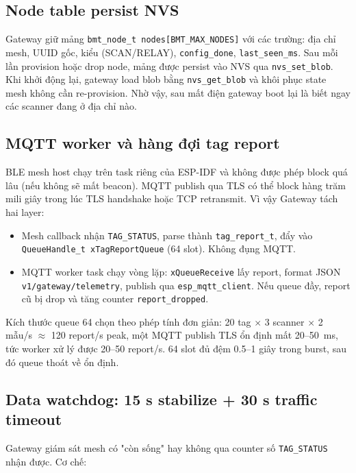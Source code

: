 \subsection{Node table persist NVS}

Gateway giữ mảng \texttt{bmt\_node\_t nodes[BMT\_MAX\_NODES]} với các trường: địa chỉ mesh, UUID gốc, kiểu (SCAN/RELAY), \texttt{config\_done}, \texttt{last\_seen\_ms}. Sau mỗi lần provision hoặc drop node, mảng được persist vào NVS qua \texttt{nvs\_set\_blob}. Khi khởi động lại, gateway load blob bằng \texttt{nvs\_get\_blob} và khôi phục state mesh không cần re-provision. Nhờ vậy, sau mất điện gateway boot lại là biết ngay các scanner đang ở địa chỉ nào.

\subsection{MQTT worker và hàng đợi tag report}

BLE mesh host chạy trên task riêng của ESP-IDF và không được phép block quá lâu (nếu không sẽ mất beacon). MQTT publish qua TLS có thể block hàng trăm mili giây trong lúc TLS handshake hoặc TCP retransmit. Vì vậy Gateway tách hai layer:

\begin{itemize}
    \item Mesh callback nhận \texttt{TAG\_STATUS}, parse thành \texttt{tag\_report\_t}, đẩy vào \texttt{QueueHandle\_t xTagReportQueue} (64 slot). Không đụng MQTT.
    \item MQTT worker task chạy vòng lặp: \texttt{xQueueReceive} lấy report, format JSON \texttt{v1/gateway/telemetry}, publish qua \texttt{esp\_mqtt\_client}. Nếu queue đầy, report cũ bị drop và tăng counter \texttt{report\_dropped}.
\end{itemize}

Kích thước queue 64 chọn theo phép tính đơn giản: 20 tag $\times$ 3 scanner $\times$ 2 mẫu/s $\approx$ 120 report/s peak, một MQTT publish TLS ổn định mất 20--50~ms, tức worker xử lý được 20--50 report/s. 64 slot đủ đệm 0.5--1 giây trong burst, sau đó queue thoát về ổn định.

\subsection{Data watchdog: 15 s stabilize + 30 s traffic timeout}

Gateway giám sát mesh có "còn sống" hay không qua counter số \texttt{TAG\_STATUS} nhận được. Cơ chế:

